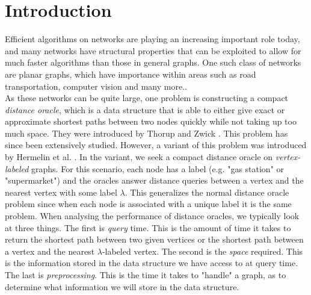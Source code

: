 \section{Introduction}\label{introduction}
Efficient algorithms on networks are playing an increasing important role today, and many
networks have structural properties that can be exploited to allow for much faster
algorithms than those in general graphs. One such class of networks are planar graphs, which have importance within
areas such as road transportation, computer vision and many more.. \\
As these networks can be quite large, one problem is constructing a compact \textit{distance
oracle}, which is a data structure that is able to either give exact or approximate
shortest paths between two nodes quickly while not taking up too much space. They were
introduced by Thorup and Zwick \cite{thorup2005approximate}. This problem has since been
extensively studied. However, a variant of this problem
was introduced by Hermelin et al. \cite{hermelin2011distance}. In the variant, we seek a
compact distance oracle on \textit{vertex-labeled} graphs. For this scenario, each node has a label (e.g. "gas
station" or "supermarket") and the oracles answer distance queries between a vertex and
the nearest vertex with some label $\lambda$. This generalizes the normal distance oracle problem since when each node is
associated with a unique label it is the same problem.
When analysing the performance of
distance oracles, we typically look at three things. The first is \textit{query} time.
This is the amount of time it takes to return the shortest path between two given
vertices or the shortest path between a vertex and the nearest $\lambda$-labeled vertex.
The second is the \textit{space} required. This is the information stored in the data
structure we have access to at query time. The last is \textit{preprocessing}. This is
the time it takes to "handle" a graph, as to determine what information we will store
in the data structure. \\

